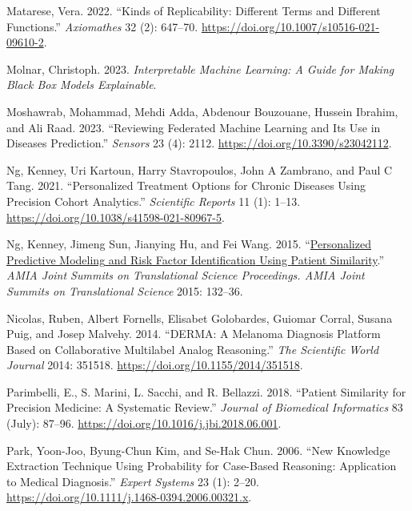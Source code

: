 \documentclass{article}
\newlength{\cslhangindent}
\newlength{\cslentryspacingunit} %
\newenvironment{CSLReferences}[2] %
 {%
  \setlength{\parindent}{0pt}
  \ifodd #1
  \let\oldpar\par
  \def\par{\hangindent=\cslhangindent\oldpar}
  \fi
  \setlength{\parskip}{#2\cslentryspacingunit}
 }%
 {}
\begin{document}
\begin{CSLReferences}{1}{0}
\leavevmode{}%
Matarese, Vera. 2022. {``Kinds of {Replicability}: {Different Terms} and
{Different Functions}.''} \emph{Axiomathes} 32 (2): 647--70.
\url{https://doi.org/10.1007/s10516-021-09610-2}.

\leavevmode{}%
Molnar, Christoph. 2023. \emph{Interpretable {Machine Learning}: {A
Guide} for {Making Black Box Models Explainable}}.

\leavevmode{}%
Moshawrab, Mohammad, Mehdi Adda, Abdenour Bouzouane, Hussein Ibrahim,
and Ali Raad. 2023. {``Reviewing {Federated Machine Learning} and {Its
Use} in {Diseases Prediction}.''} \emph{Sensors} 23 (4): 2112.
\url{https://doi.org/10.3390/s23042112}.

\leavevmode{}%
Ng, Kenney, Uri Kartoun, Harry Stavropoulos, John A Zambrano, and Paul C
Tang. 2021. {``Personalized Treatment Options for Chronic Diseases Using
Precision Cohort Analytics.''} \emph{Scientific Reports} 11 (1): 1--13.
\url{https://doi.org/10.1038/s41598-021-80967-5}.

\leavevmode{}%
Ng, Kenney, Jimeng Sun, Jianying Hu, and Fei Wang. 2015.
{``\href{https://www.ncbi.nlm.nih.gov/pmc/articles/PMC4525240}{Personalized
{Predictive Modeling} and {Risk Factor Identification} Using {Patient
Similarity}}.''} \emph{AMIA Joint Summits on Translational Science
Proceedings. AMIA Joint Summits on Translational Science} 2015: 132--36.

\leavevmode{}%
Nicolas, Ruben, Albert Fornells, Elisabet Golobardes, Guiomar Corral,
Susana Puig, and Josep Malvehy. 2014. {``{DERMA}: A Melanoma Diagnosis
Platform Based on Collaborative Multilabel Analog Reasoning.''}
\emph{The Scientific World Journal} 2014: 351518.
\url{https://doi.org/10.1155/2014/351518}.

\leavevmode{}%
Parimbelli, E., S. Marini, L. Sacchi, and R. Bellazzi. 2018. {``Patient
Similarity for Precision Medicine: {A} Systematic Review.''}
\emph{Journal of Biomedical Informatics} 83 (July): 87--96.
\url{https://doi.org/10.1016/j.jbi.2018.06.001}.

\leavevmode{}%
Park, Yoon-Joo, Byung-Chun Kim, and Se-Hak Chun. 2006. {``New Knowledge
Extraction Technique Using Probability for Case-Based Reasoning:
Application to Medical Diagnosis.''} \emph{Expert Systems} 23 (1):
2--20. \url{https://doi.org/10.1111/j.1468-0394.2006.00321.x}.


\end{CSLReferences}
\end{document}

